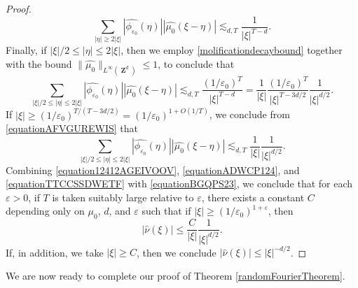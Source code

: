 \documentclass[12pt,reqno]{article}
\numberwithin{equation}{section}
\DeclareMathOperator{\ZZ}{\mathbf{Z}}
\begin{document}
\begin{proof}
    \begin{equation} \label{equationADWCP124}
        \sum_{|\eta| \geq 2 |\xi|} |\widehat{\phi_{\varepsilon_0}}(\eta)| |\widehat{\mu_0}(\xi-\eta)| \lesssim_{d,T} \frac{1}{|\xi|^{T-d}}.
    \end{equation}
    Finally, if $|\xi|/2 \leq |\eta| \leq 2|\xi|$, then we employ \eqref{molificationdecaybound} together with the bound $\| \widehat{\mu_0} \|_{L^\infty(\ZZ^d)} \leq 1$, to conclude that
    \begin{equation} \label{equationAFVGUREWIS}
        \sum_{|\xi|/2 \leq |\eta| \leq 2 |\xi|} |\widehat{\phi_{\varepsilon_0}}(\eta)| |\widehat{\mu_0}(\xi-\eta)| \lesssim_{d,T} \frac{(1/\varepsilon_0)^T}{|\xi|^{T-d}} = \frac{1}{|\xi|} \frac{(1/\varepsilon_0)^T}{|\xi|^{T-3d/2}} \frac{1}{|\xi|^{d/2}}.
    \end{equation}
    If $|\xi| \geq (1/\varepsilon_0)^{T/(T - 3d/2)} = (1/\varepsilon_0)^{1 + O(1/T)}$, we conclude from \eqref{equationAFVGUREWIS} that
    \begin{equation} \label{equationTTCCSSDWETF}
        \sum_{|\xi|/2 \leq |\eta| \leq 2 |\xi|} |\widehat{\phi_{\varepsilon_0}}(\eta)| |\widehat{\mu_0}(\xi-\eta)| \lesssim_{d,T} \frac{1}{|\xi|} \frac{1}{|\xi|^{d/2}}.
    \end{equation}
    Combining \eqref{equation12412AGEIVOOV}, \eqref{equationADWCP124}, and \eqref{equationTTCCSSDWETF} with \eqref{equationBGQPS23}, we conclude that for each $\varepsilon > 0$, if $T$ is taken suitably large relative to $\varepsilon$, there exists a constant $C$ depending only on $\mu_0$, $d$, and $\varepsilon$ such that if $|\xi| \geq (1/\varepsilon_0)^{1 + \varepsilon}$, then
    \[ |\widehat{\nu}(\xi)| \leq \frac{C}{|\xi|} \frac{1}{|\xi|^{d/2}}. \]
    If, in addition, we take $|\xi| \geq C$, then we conclude $|\widehat{\nu}(\xi)| \leq |\xi|^{-d/2}$.
\end{proof}

We are now ready to complete our proof of Theorem \ref{randomFourierTheorem}.
\end{document}
